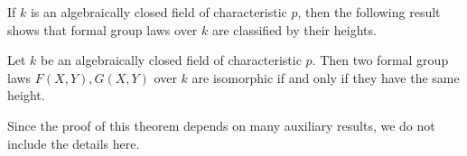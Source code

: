 If $k$ is an algebraically closed field of characteristic $p$,
then the following result shows that formal group laws over $k$ are classified by
their heights.

\begin{theorem}
    Let $k$ be an algebraically closed field of characteristic $p$. Then two formal group laws
    $F(X,Y), G(X,Y)$ over $k$ are isomorphic if and only if they have the same height.
\end{theorem}

Since the proof of this theorem depends on many auxiliary results, we do
not include the details here.

